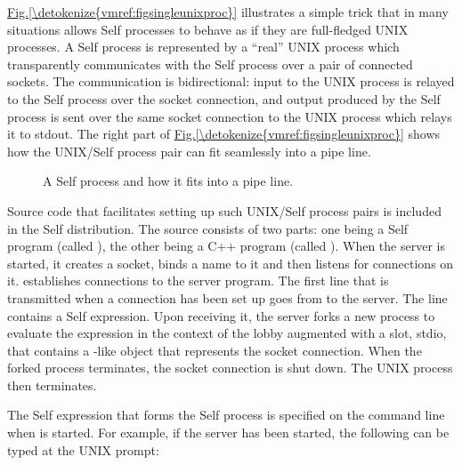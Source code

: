 \documentclass[letterpaper,10pt,english]{sphinxmanual}
\begin{document}
\hyperref[\detokenize{vmref:figsingleunixproc}]{Fig.\@ \ref{\detokenize{vmref:figsingleunixproc}}} illustrates a simple trick that in many situations allows Self processes to behave as if they
are full-fledged UNIX processes. A Self process is represented by a “real” UNIX process which
transparently communicates with the Self process over a pair of connected sockets. The communication
is bidirectional: input to the UNIX process is relayed to the Self process over the socket
connection, and output produced by the Self process is sent over the same socket connection to
the UNIX process which relays it to stdout. The right part of \hyperref[\detokenize{vmref:figsingleunixproc}]{Fig.\@ \ref{\detokenize{vmref:figsingleunixproc}}} shows how the UNIX/Self
process pair can fit seamlessly into a pipe line.
\begin{figure}[htbp]
\centering
\capstart

\noindent{}
\caption{A Self process and how it fits into a pipe line.}\label{\detokenize{vmref:id15}}\end{figure}

Source code that facilitates setting up such UNIX/Self process pairs is included in the Self distribution.
The source consists of two parts: one being a Self program (called ), the other being
a C++ program (called ). When the server is started, it creates a socket, binds a name to it
and then listens for connections on it.  establishes connections to the server program. The
first line that is transmitted when a connection has been set up goes from  to the server. The
line contains a Self expression. Upon receiving it, the server forks a new process to evaluate the
expression in the context of the lobby augmented with a slot, stdio, that contains a -like
object that represents the socket connection. When the forked process terminates, the socket connection
is shut down. The  UNIX process then terminates.

The Self expression that forms the Self process is specified on the command line when 
is started. For example, if the server has been started, the following can be typed at the UNIX
prompt:
\end{document}
